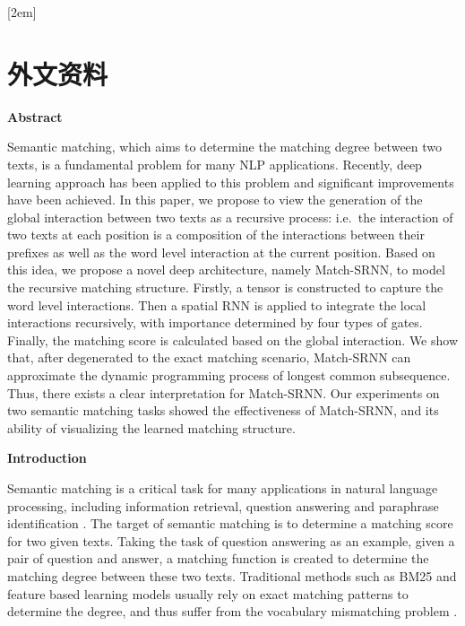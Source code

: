 
[2em]{\vspace{.5\baselineskip}\xiaosan\song}%
             {\prechaptername\CJKnumber{\thecontentslabel}\postchaptername\qquad}{} %
             {}             %
\chapter*{外文资料}
\thispagestyle{empty}
\pagestyle{empty}
\textbf{Abstract}

Semantic matching, which aims to determine the matching degree between two texts, is a fundamental problem for many NLP applications. Recently, deep learning approach has been applied to this problem and significant improvements have been achieved. In this paper, we propose to view the generation of the global interaction between two texts as a recursive process: i.e.~the interaction of two texts at each position is a composition of the interactions between their prefixes as well as the word level interaction at the current position. Based on this idea, we propose a novel deep architecture, namely Match-SRNN, to model the recursive matching structure. Firstly, a tensor is constructed to capture the word level interactions. Then a spatial RNN is applied to integrate the local interactions recursively, with importance determined by four types of gates. Finally, the matching score is calculated based on the global interaction. We show that, after degenerated to the exact matching scenario, Match-SRNN can approximate the dynamic programming process of longest common subsequence. Thus, there exists a clear interpretation for Match-SRNN. Our experiments on two semantic matching tasks showed the effectiveness of Match-SRNN, and its ability of visualizing the learned matching structure.

	
\textbf{Introduction}

Semantic matching is a critical task for many applications in natural language processing, including information retrieval, question answering and paraphrase identification \cite{li2014semantic}. The target of semantic matching is to determine a matching score for two given texts.
Taking the task of question answering as an example, given a pair of question and answer, a matching function is created to determine the matching degree between these two texts. Traditional methods such as BM25 and feature based learning models usually rely on exact matching patterns to determine the degree, and thus suffer from the vocabulary mismatching problem \cite{li2014semantic}.

